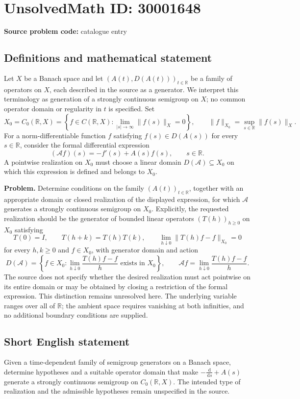 \documentclass[11pt]{article}
\newcommand{\R}{\mathbb{R}}
\newcommand{\dd}{\,\mathrm{d}}
\begin{document}
\section*{UnsolvedMath ID: 30001648}
\textbf{Source problem code:} catalogue entry
\subsection{Definitions and mathematical statement}
Let \(X\) be a Banach space and let \((A(t),D(A(t)))_{t\in\R}\) be a family of operators on \(X\), each described in the source as a generator. We interpret this terminology as generation of a strongly continuous semigroup on \(X\); no common operator domain or regularity in \(t\) is specified. Set
\[
X_0=C_0(\R,X)=\left\{f\in C(\R,X):\lim_{|s|\to\infty}\|f(s)\|_X=0\right\},
\qquad \|f\|_{X_0}=\sup_{s\in\R}\|f(s)\|_X.
\]
For a norm-differentiable function \(f\) satisfying \(f(s)\in D(A(s))\) for every \(s\in\R\), consider the formal differential expression
\[
(\mathcal Af)(s)=-f'(s)+A(s)f(s),\qquad s\in\R.
\]
A pointwise realization on \(X_0\) must choose a linear domain \(D(\mathcal A)\subseteq X_0\) on which this expression is defined and belongs to \(X_0\).

\textbf{Problem.} Determine conditions on the family \((A(t))_{t\in\R}\), together with an appropriate domain or closed realization of the displayed expression, for which \(\mathcal A\) generates a strongly continuous semigroup on \(X_0\). Explicitly, the requested realization should be the generator of bounded linear operators \((T(h))_{h\geq0}\) on \(X_0\) satisfying
\[
T(0)=I,\qquad T(h+k)=T(h)T(k),\qquad
\lim_{h\downarrow0}\|T(h)f-f\|_{X_0}=0
\]
for every \(h,k\geq0\) and \(f\in X_0\), with generator domain and action
\[
D(\mathcal A)=\left\{f\in X_0:\lim_{h\downarrow0}\frac{T(h)f-f}{h}\text{ exists in }X_0\right\},
\qquad
\mathcal Af=\lim_{h\downarrow0}\frac{T(h)f-f}{h}.
\]
The source does not specify whether the desired realization must act pointwise on its entire domain or may be obtained by closing a restriction of the formal expression. This distinction remains unresolved here. The underlying variable ranges over all of \(\R\); the ambient space requires vanishing at both infinities, and no additional boundary conditions are supplied.
\subsection{Short English statement}
Given a time-dependent family of semigroup generators on a Banach space, determine hypotheses and a suitable operator domain that make \(-\frac{\dd}{\dd s}+A(s)\) generate a strongly continuous semigroup on \(C_0(\R,X)\). The intended type of realization and the admissible hypotheses remain unspecified in the source.
\end{document}
